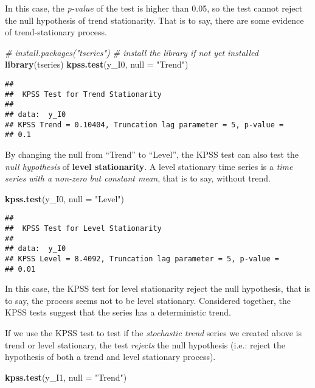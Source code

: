 \documentclass[
]{article}
\newenvironment{Shaded}{\begin{snugshade}}{\end{snugshade}}
\newcommand{\AttributeTok}[1]{\textcolor[rgb]{0.13,0.29,0.53}{#1}}
\newcommand{\CommentTok}[1]{\textcolor[rgb]{0.56,0.35,0.01}{\textit{#1}}}
\newcommand{\FunctionTok}[1]{\textcolor[rgb]{0.13,0.29,0.53}{\textbf{#1}}}
\newcommand{\NormalTok}[1]{#1}
\newcommand{\StringTok}[1]{\textcolor[rgb]{0.31,0.60,0.02}{#1}}
\begin{document}
In this case, the \emph{p-value} of the test is higher than 0.05, so the test cannot reject the null hypothesis of trend stationarity. That is to say, there are some evidence of trend-stationary process.

\begin{Shaded}
\begin{Highlighting}[]
\CommentTok{\# install.packages("tseries") \# install the library if not yet installed}
\FunctionTok{library}\NormalTok{(tseries)}
\FunctionTok{kpss.test}\NormalTok{(y\_I0, }\AttributeTok{null =} \StringTok{"Trend"}\NormalTok{)}
\end{Highlighting}
\end{Shaded}

\begin{verbatim}
## 
##  KPSS Test for Trend Stationarity
## 
## data:  y_I0
## KPSS Trend = 0.10404, Truncation lag parameter = 5, p-value =
## 0.1
\end{verbatim}

By changing the null from ``Trend'' to ``Level'', the KPSS test can also test the \emph{null hypothesis} of \textbf{level stationarity}. A level stationary time series is a \emph{time series with a non-zero but constant mean}, that is to say, without trend.

\begin{Shaded}
\begin{Highlighting}[]
\FunctionTok{kpss.test}\NormalTok{(y\_I0, }\AttributeTok{null =} \StringTok{"Level"}\NormalTok{)}
\end{Highlighting}
\end{Shaded}

\begin{verbatim}
## 
##  KPSS Test for Level Stationarity
## 
## data:  y_I0
## KPSS Level = 8.4092, Truncation lag parameter = 5, p-value =
## 0.01
\end{verbatim}

In this case, the KPSS test for level stationarity reject the null hypothesis, that is to say, the process seems not to be level stationary. Considered together, the KPSS tests suggest that the series has a deterministic trend.

If we use the KPSS test to test if the \emph{stochastic trend} series we created above is trend or level stationary, the test \emph{rejects} the null hypothesis (i.e.: reject the hypothesis of both a trend and level stationary process).

\begin{Shaded}
\begin{Highlighting}[]
\FunctionTok{kpss.test}\NormalTok{(y\_I1, }\AttributeTok{null =} \StringTok{"Trend"}\NormalTok{)}
\end{Highlighting}
\end{Shaded}
\end{document}
